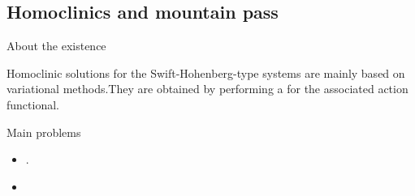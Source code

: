 \documentclass[9pt, english]{beamer}
\theoremstyle{definition}
\begin{document}
\subsection{Homoclinics and mountain pass}
\begin{frame}{About the existence}
    \begin{block}{Homoclinic solutions}
        for the Swift-Hohenberg-type systems are mainly based on  variational
        methods.\pause They are obtained by performing a
        {\color{yellow}{mountain-pass procedure}\/} for the associated action functional.
    \end{block}
    \pause
    \begin{block}{Main problems}\pause
        \begin{itemize}
        \item {\color{red}{Failure of the Palais-Smale condition}.\/}\pause
        \item {\color{red}{The functional is unbounded both from above and
        below.}\/}
        \end{itemize}
    \end{block}
\end{frame}
\end{document}
